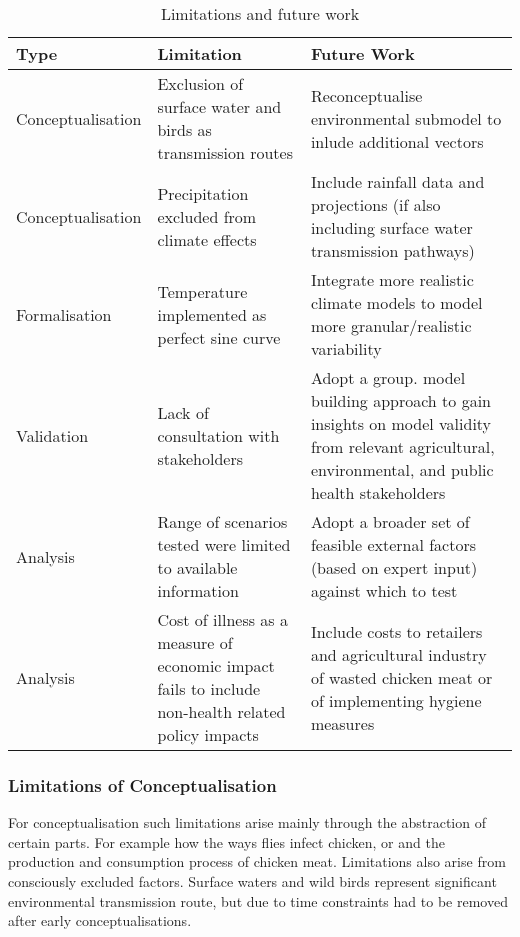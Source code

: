 \begin{table}[h!]
\centering
\caption{Limitations and future work}
\label{tab:limitations}
\begin{tabular}{ l  p{4.5cm}  p{6.5cm}}
\hline
Type &
   Limitation &
  Future Work \\ \hline
Conceptualisation &
  Exclusion of surface water and birds as transmission routes &
  Reconceptualise environmental submodel to inlude additional vectors \\
Conceptualisation &
  Precipitation excluded from climate effects&
  Include rainfall data and projections (if also including surface water transmission pathways) \\
Formalisation &
  Temperature implemented as perfect sine curve&
  Integrate more realistic climate models to model more granular/realistic variability \\
Validation &
  Lack of consultation with stakeholders &
  Adopt a group. model building approach to gain insights on model validity from relevant agricultural, environmental, and public health stakeholders \\
Analysis &
  Range of scenarios tested were limited to available information &
  Adopt a broader set of feasible external factors (based on expert input) against which to test \\
Analysis &
  Cost of illness as a measure of economic impact fails to include non-health related policy impacts &
  Include costs to retailers and agricultural industry of wasted chicken meat or of implementing hygiene measures \\ \hline
\end{tabular}
\end{table}
\iffalse
\subsubsection{Limitations of Conceptualisation}

For conceptualisation such limitations arise mainly through the abstraction of certain parts. For example how the ways flies infect chicken, or and the production and consumption process of chicken meat. Limitations also arise from consciously excluded factors. Surface waters and wild birds represent significant environmental transmission route, but due to time constraints had to be removed after early conceptualisations. 


